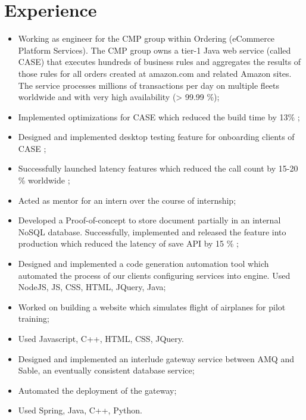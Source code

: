 \documentclass[9pt,a4paper]{moderncv}
\begin{document}
\maketitle
\section{Experience}
{
\begin{itemize}
 \item Working as engineer for the CMP group within Ordering (eCommerce Platform Services). The CMP group owns a tier-1 Java web service (called CASE) that executes hundreds of business rules and aggregates the results of those rules for all orders created at amazon.com and related Amazon sites. The service processes millions of transactions per day on multiple fleets worldwide and with very high availability (> 99.99 \%);
 \item Implemented optimizations for CASE which reduced the build time by 13\% ;
 \item Designed and implemented desktop testing feature for onboarding clients of CASE ;
 \item Successfully launched latency features which reduced the call count by 15-20 \%
 worldwide ;
 \item Acted as mentor for an intern over the course of internship;
 \item Developed a Proof-of-concept to store document partially in an internal NoSQL database. Successfully, implemented and released the feature into production which reduced the latency of save API by 15 \% ;
\item Designed and implemented a code generation automation tool which automated the process of our clients configuring services into engine. Used NodeJS, JS, CSS, HTML, JQuery, Java; 
\end{itemize}}
{
\begin{itemize}
 \item Worked on building a website which simulates flight of airplanes for pilot training;
 \item Used Javascript, C++, HTML, CSS, JQuery.
\end{itemize}}
{
\begin{itemize}
 \item Designed and implemented an interlude gateway service between AMQ and Sable, an eventually consistent database service;
 \item Automated the deployment of the gateway;
 \item Used Spring, Java, C++, Python.
\end{itemize}}
\end{document}
